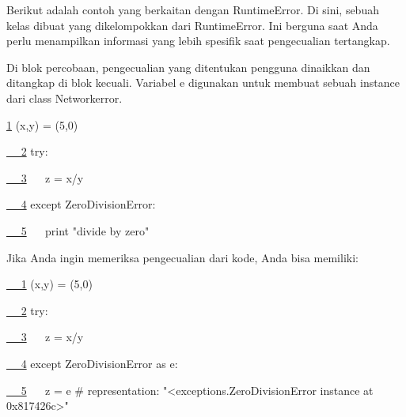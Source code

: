 \documentclass[a4paper,12pt]{report}
\begin{document}
\vspace{12pt}
\noindent 
Berikut adalah contoh yang berkaitan dengan RuntimeError. Di sini, sebuah kelas dibuat yang dikelompokkan dari RuntimeError. Ini berguna saat Anda perlu menampilkan informasi yang lebih spesifik saat pengecualian tertangkap. \par
\vspace{12pt}
\noindent 
Di blok percobaan, pengecualian yang ditentukan pengguna dinaikkan dan ditangkap di blok kecuali. Variabel e digunakan untuk membuat sebuah instance dari class Networkerror. \par
\vspace{12pt}
\noindent 
\href{https://wiki.python.org/moin/HandlingExceptions}{1}
{\fontsize{10pt}{10pt}\selectfont  (x,y) = (5,0)} \par
\noindent 
\href{https://wiki.python.org/moin/HandlingExceptions}{~~ 2}
{\fontsize{10pt}{10pt}\selectfont  try:} \par
\noindent 
\href{https://wiki.python.org/moin/HandlingExceptions}{~~ 3}
{\fontsize{10pt}{10pt}\selectfont ~~ z = x/y} \par
\noindent 
\href{https://wiki.python.org/moin/HandlingExceptions}{~~ 4}
{\fontsize{10pt}{10pt}\selectfont  except ZeroDivisionError:} \par
\noindent 
\href{https://wiki.python.org/moin/HandlingExceptions}{~~ 5}
{\fontsize{10pt}{10pt}\selectfont ~~ print "divide by zero"} \par
\noindent 
Jika Anda ingin memeriksa pengecualian dari kode, Anda bisa memiliki: \par
\noindent 
\vspace{12pt}
\noindent 
\vspace{12pt}
\noindent 
\vspace{12pt}
\noindent 
\href{https://wiki.python.org/moin/HandlingExceptions}{~~ 1}
{\fontsize{10pt}{10pt}\selectfont  (x,y) = (5,0)} \par
\noindent 
\href{https://wiki.python.org/moin/HandlingExceptions}{~~ 2}
{\fontsize{10pt}{10pt}\selectfont  try:} \par
\noindent 
\href{https://wiki.python.org/moin/HandlingExceptions}{~~ 3}
{\fontsize{10pt}{10pt}\selectfont ~~ z = x/y} \par
\noindent 
\href{https://wiki.python.org/moin/HandlingExceptions}{~~ 4}
{\fontsize{10pt}{10pt}\selectfont  except ZeroDivisionError as e:} \par
\noindent 
\href{https://wiki.python.org/moin/HandlingExceptions}{~~ 5}
{\fontsize{10pt}{10pt}\selectfont ~~ z = e  $  \#  $ representation: "<exceptions.ZeroDivisionError instance at 0x817426c>"} \par
\end{document}
